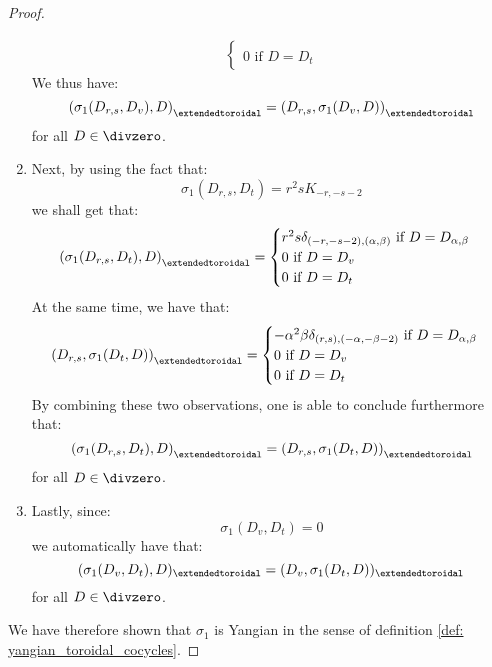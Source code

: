 \begin{proof}
\begin{enumerate}
$$\begin{aligned}
\begin{cases}
                                    \\
                                    \text{$0$ if $D = D_t$}
                                \end{cases}
                            \end{aligned}
                        $$
                    We thus have:
                        $$\left( \sigma_1(D_{r, s}, D_v), D \right)_{\extendedtoroidal} = \left( D_{r, s}, \sigma_1(D_v, D) \right)_{\extendedtoroidal}$$
                    for all $D \in \divzero$.
                    \item Next, by using the fact that:
                        $$\sigma_1(D_{r, s}, D_t) = r^2 s K_{-r, -s - 2}$$
                    we shall get that:
                        $$
                            \left( \sigma_1(D_{r, s}, D_t), D \right)_{\extendedtoroidal} =
                            \begin{cases}
                                \text{$r^2 s \delta_{(-r, -s - 2), (\alpha, \beta)}$ if $D = D_{\alpha, \beta}$}
                                \\
                                \text{$0$ if $D = D_v$}
                                \\
                                \text{$0$ if $D = D_t$}
                            \end{cases}
                        $$
                    At the same time, we have that:
                        $$
                            \begin{aligned}
                                \left( D_{r, s}, \sigma_1(D_t, D) \right)_{\extendedtoroidal} =
                                \begin{cases}
                                    \text{$-\alpha^2 \beta \delta_{(r, s), (-\alpha, -\beta - 2)}$ if $D = D_{\alpha, \beta}$}
                                    \\
                                    \text{$0$ if $D = D_v$}
                                    \\
                                    \text{$0$ if $D = D_t$}
                                \end{cases}
                            \end{aligned}
                        $$
                    By combining these two observations, one is able to conclude furthermore that:
                        $$\left( \sigma_1(D_{r, s}, D_t), D \right)_{\extendedtoroidal} = \left( D_{r, s}, \sigma_1(D_t, D) \right)_{\extendedtoroidal}$$
                    for all $D \in \divzero$.
                    \item Lastly, since:
                        $$\sigma_1(D_v, D_t) = 0$$
                    we automatically have that:
                        $$( \sigma_1(D_v, D_t), D )_{\extendedtoroidal} = ( D_v, \sigma_1(D_t, D) )_{\extendedtoroidal}$$
                    for all $D \in \divzero$.
                \end{enumerate}
                We have therefore shown that $\sigma_1$ is Yangian in the sense of definition \ref{def: yangian_toroidal_cocycles}. 
            \end{proof}
